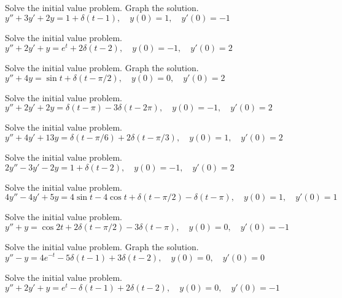 \documentclass{ximera}
\begin{document}
\begin{problem}\label{exer:8.7.9} Solve the initial value problem.  Graph the solution.
 $y''+3y'+2y=1+\delta(t-1), \quad  y(0)=1,\quad y'(0)=-1$
\end{problem}

\begin{problem}\label{exer:8.7.10}
Solve the initial value
problem.
 $y''+2y'+y=e^t+2\delta(t-2), \quad  y(0)=-1,\quad y'(0)=2$
\end{problem}

\begin{problem}\label{exer:8.7.11} Solve the initial value problem.  Graph the solution.
 $y''+4y=\sin t+\delta(t-\pi/2), \quad  y(0)=0,\quad y'(0)=2$
\end{problem}

\begin{problem}\label{exer:8.7.12}
Solve the initial value
problem.
 $y''+2y'+2y=\delta(t-\pi)-3\delta(t-2\pi), \quad  y(0)=-1,\quad y'(0)=2$
\end{problem}

\begin{problem}\label{exer:8.7.13}
Solve the initial value
problem.
$y''+4y'+13y=\delta(t-\pi/6)+2\delta(t-\pi/3), \quad  y(0)=1,\quad y'(0)=2$
\end{problem}

\begin{problem}\label{exer:8.7.14}
Solve the initial value
problem.
$2y''-3y'-2y=1+\delta(t-2), \quad  y(0)=-1,\quad y'(0)=2$
\end{problem}

\begin{problem}\label{exer:8.7.15}
Solve the initial value
problem.
$4y''-4y'+5y=4\sin t-4\cos
t+\delta(t-\pi/2)-\delta(t-\pi), \quad  y(0)=1,\quad y'(0)=1$
\end{problem}

\begin{problem}\label{exer:8.7.16}
Solve the initial value
problem.
$y''+y=\cos2t+2\delta(t-\pi/2)-3\delta(t-\pi), \quad  y(0)=0,\quad y'(0)=-1$
\end{problem}

\begin{problem}\label{exer:8.7.17} Solve the initial value problem.  Graph the solution.
$y''-y=4e^{-t}-5\delta(t-1)+3\delta(t-2), \quad  y(0)=0,\quad y'(0)=0$
\end{problem}

\begin{problem}\label{exer:8.7.18}
Solve the initial value
problem.
$y''+2y'+y=e^t-\delta(t-1)+2\delta(t-2), \quad  y(0)=0,\quad y'(0)=-1$
\end{problem}
\end{document}
